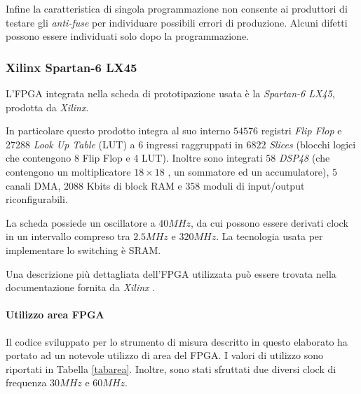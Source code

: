 Infine la caratteristica di singola programmazione non consente ai produttori di testare gli \textit{anti-fuse} per individuare possibili errori di produzione. Alcuni difetti possono essere individuati solo dopo la programmazione.

\subsubsection{Xilinx Spartan-6 LX45}
L'FPGA integrata nella scheda di prototipazione usata è la \textit{Spartan-6 LX45}, prodotta da \textit{Xilinx}.

In particolare questo prodotto integra al suo interno $54576$ registri \textit{Flip Flop} e 27288 \textit{Look Up Table} (LUT) a 6 ingressi raggruppati in $6822$ \textit{Slices} (blocchi logici che contengono 8 Flip Flop e 4 LUT). Inoltre sono integrati $58$ \textit{DSP48} (che contengono un moltiplicatore $18 \times 18$ , un sommatore ed un accumulatore), $5$ canali DMA, $2088$ Kbits di block RAM e $358$ moduli di input/output riconfigurabili. 

La scheda possiede un oscillatore a $40MHz$, da cui possono essere derivati clock in un intervallo compreso tra $2.5MHz$ e $320MHz$. La tecnologia usata per implementare lo switching è SRAM. 

Una descrizione più dettagliata dell'FPGA utilizzata può essere trovata nella documentazione fornita da \textit{Xilinx} \cite{dsxilinx}.

\paragraph{Utilizzo area FPGA}
Il codice sviluppato per lo strumento di misura descritto in questo elaborato ha portato ad un notevole utilizzo di area del FPGA. I valori di utilizzo sono riportati in Tabella \ref{tabarea}. Inoltre, sono stati sfruttati due diversi clock di frequenza $30MHz$ e $60MHz$.

